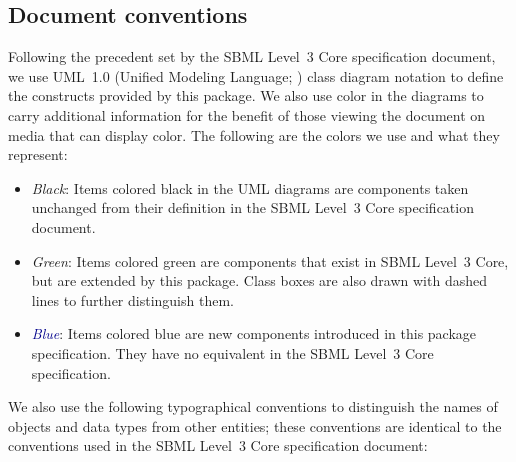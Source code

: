 \subsection{Document conventions}
\label{conventions}

Following the precedent set by the SBML Level~3 Core specification document, we use UML~1.0 (Unified Modeling Language; \citealt{eriksson:1998,oestereich:1999}) class diagram notation to define the constructs provided by this package.  We also use color in the diagrams to carry additional information for the benefit of those viewing the document on media that can display color.  The following are the colors we use and what they represent:

\begin{itemize}

\item[\raisebox{2.75pt}{\colorbox{black}{\rule{0.8pt}{0.8pt}}}] \emph{Black}: Items colored black in the UML diagrams are components taken unchanged from their definition in the SBML Level~3 Core specification document.

\item[\raisebox{2.75pt}{\colorbox{mediumgreen}{\rule{0.8pt}{0.8pt}}}] \emph{\textcolor{mediumgreen}{Green}}: Items colored green are components that exist in SBML Level~3 Core, but are extended by this package.  Class boxes are also drawn with dashed lines to further distinguish them.

\item[\raisebox{2.75pt}{\colorbox{darkblue}{\rule{0.8pt}{0.8pt}}}] \emph{\textcolor{darkblue}{Blue}}: Items colored blue are new components introduced in this package specification.  They have no equivalent in the SBML Level~3 Core specification.

\end{itemize}

We also use the following typographical conventions to distinguish the names of objects and data types from other entities; these conventions are identical to the conventions used in the SBML Level~3 Core specification document:


